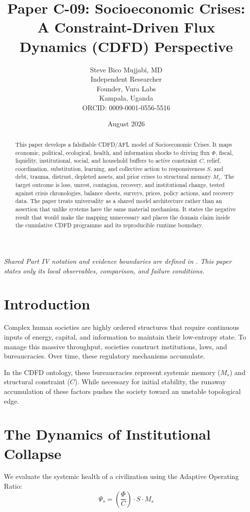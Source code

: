 \documentclass[11pt,a4paper]{article}
\title{\textbf{Paper C-09: Socioeconomic Crises:\\ A Constraint-Driven Flux Dynamics (CDFD) Perspective}}
\author{Steve Bico Mujjabi, MD\\
\small Independent Researcher\\
\small Founder, Vura Labs\\
\small Kampala, Uganda\\
\small ORCID: 0009-0001-0556-5516}
\date{August 2026}
\begin{document}
\maketitle

\noindent\textit{Shared Part IV notation and evidence boundaries are defined in . This paper states only its local observables, comparison, and failure conditions.}


\begin{abstract}
This paper develops a falsifiable CDFD/AFL model of Socioeconomic Crises. It maps economic, political, ecological, health, and information shocks to driving flux $\Phi$, fiscal, liquidity, institutional, social, and household buffers to active constraint $C$, relief, coordination, substitution, learning, and collective action to responsiveness $S$, and debt, trauma, distrust, depleted assets, and prior crises to structural memory $M_s$. The target outcome is loss, unrest, contagion, recovery, and institutional change, tested against crisis chronologies, balance sheets, surveys, prices, policy actions, and recovery data. The paper treats universality as a shared model architecture rather than an assertion that unlike systems have the same material mechanism. It states the negative result that would make the mapping unnecessary and places the domain claim inside the cumulative CDFD programme and its reproducible runtime boundary.
\end{abstract}

\section{Introduction}

Complex human societies are highly ordered structures that require continuous inputs of energy, capital, and information to maintain their low-entropy state. To manage this massive throughput, societies construct institutions, laws, and bureaucracies. Over time, these regulatory mechanisms accumulate.

In the CDFD ontology, these bureaucracies represent systemic memory ($M_s$) and structural constraint ($C$). While necessary for initial stability, the runaway accumulation of these factors pushes the society toward an unstable topological edge.

\section{The Dynamics of Institutional Collapse}
We evaluate the systemic health of a civilization using the Adaptive Operating Ratio:
\begin{equation}
    \Psi_s = \left( \frac{\Phi}{C} \right) \cdot S \cdot M_s
\end{equation}
\end{document}

